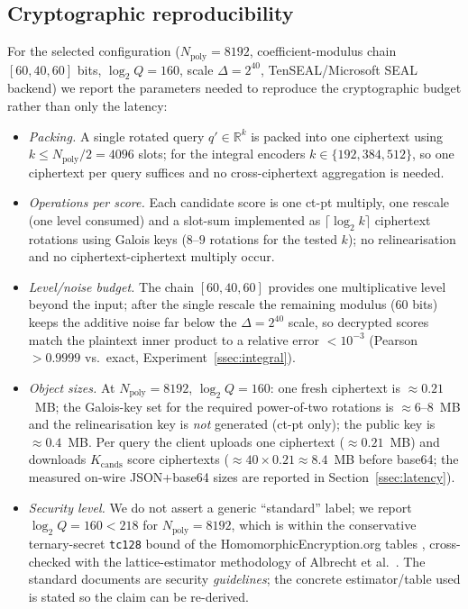 \documentclass[11pt,a4paper]{article}
\begin{document}
\subsection{Cryptographic reproducibility}\label{ssec:crypto-detail}

For the selected configuration
($N_{\mathrm{poly}} = 8192$, coefficient-modulus chain $[60,40,60]$ bits,
$\log_2 Q = 160$, scale $\Delta = 2^{40}$, TenSEAL/Microsoft SEAL
backend) we report the parameters needed to reproduce the cryptographic
budget rather than only the latency:

\begin{itemize}[leftmargin=18pt,topsep=2pt,itemsep=2pt]
\item \emph{Packing.} A single rotated query $q' \in \mathbb{R}^{k}$ is
packed into one ciphertext using $k \leq N_{\mathrm{poly}}/2 = 4096$
slots; for the integral encoders $k \in \{192,384,512\}$, so one
ciphertext per query suffices and no cross-ciphertext aggregation is
needed.
\item \emph{Operations per score.} Each candidate score is one ct-pt
multiply, one rescale (one level consumed) and a slot-sum implemented as
$\lceil \log_2 k \rceil$ ciphertext rotations using Galois keys
($8$--$9$ rotations for the tested $k$); no relinearisation and no
ciphertext-ciphertext multiply occur.
\item \emph{Level/noise budget.} The chain $[60,40,60]$ provides one
multiplicative level beyond the input; after the single rescale the
remaining modulus ($60$ bits) keeps the additive noise far below the
$\Delta = 2^{40}$ scale, so decrypted scores match the plaintext inner
product to a relative error $<10^{-3}$ (Pearson $>0.9999$ vs.\ exact,
Experiment~\ref{ssec:integral}).
\item \emph{Object sizes.} At $N_{\mathrm{poly}}=8192$, $\log_2 Q=160$:
one fresh ciphertext is $\approx 0.21$~MB; the Galois-key set for the
required power-of-two rotations is $\approx 6$--$8$~MB and the
relinearisation key is \emph{not} generated (ct-pt only); the public key
is $\approx 0.4$~MB. Per query the client uploads one ciphertext
($\approx 0.21$~MB) and downloads $K_{\mathrm{cands}}$ score ciphertexts
($\approx 40 \times 0.21 \approx 8.4$~MB before base64; the measured
on-wire JSON+base64 sizes are reported in
Section~\ref{ssec:latency}).
\item \emph{Security level.} We do not assert a generic ``standard''
label; we report $\log_2 Q = 160 < 218$ for $N_{\mathrm{poly}}=8192$,
which is within the conservative ternary-secret \texttt{tc128} bound of
the HomomorphicEncryption.org tables \cite{ref_he_std}, cross-checked
with the lattice-estimator methodology of Albrecht et al.\
\cite{ref_lwe_estimator}. The standard documents are security
\emph{guidelines}; the concrete estimator/table used is stated so the
claim can be re-derived.
\end{itemize}
\end{document}
